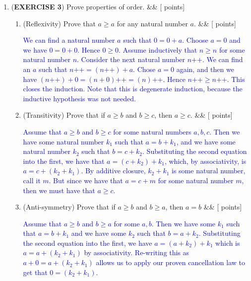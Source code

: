 \documentclass[12pt]{article}
\newcommand{\points}[1]{\hfill {[#1 points]}}
\newcommand{\problem}[2][]{%
  \item {#2}%
  \ifx&#1&%
  \else%
    \points{#1}%
  \fi
  \par\vspace{0.5em}
}
\begin{document}
\begin{enumerate}[leftmargin=*, label=\textbf{\arabic*.}]
	\problem{(\textbf{EXERCISE 3}) Prove properties of order.}
	\begin{enumerate}
	   \problem{(Reflexivity) Prove that $a \geq a$ for any natural number $a$.}
    	\textcolor{blue}{We can find a natural number $a$ such that $0 = 0 + a$. Choose $a=0$ and we have $0 = 0+0$. Hence $0 \geq 0$. Assume inductively that $n \geq n$ for some natural number $n$. Consider the next natural number $n\text{++}$. We can find an $a$ such that $n\text{++} = (n\text{++}) + a$. Chose $a=0$ again, and then we have $(n\text{++}) + 0 = (n+0)\text{++} = (n)\text{++}$. Hence $n\text{++} \geq n\text{++}$. This closes the induction. Note that this is degenerate induction, because the inductive hypothesis was not needed.}
	   \problem{(Transitivity) Prove that if $a \geq b$ and $b \geq c$, then $a \geq c$.}
    	\textcolor{blue}{Assume that $a \geq b$ and $b \geq c$ for some natural numbers $a,b,c$. Then we have some natural number $k_1$ such that $a = b + k_1$, and we have some natural number $k_2$ such that $b = c + k_2$. Substituting the second equation into the first, we have that $a = (c + k_2) + k_1$, which, by associativity, is $a = c + (k_2 + k_1)$. By additive closure, $k_2 + k_1$ is some natural number, call it $m$. But since we have that $a = c + m$ for some natural number $m$, then we must have that $a \geq c$.}
	
	\problem{(Anti-symmetry) Prove that if $a \geq b$ and $b \geq a$, then $a = b$}
	\textcolor{blue}{Assume that $a \geq b$ and $b \geq a$ for some $a,b$. Then we have some $k_1$ such that $a = b + k_1$ and we have some $k_2$ such that $b = a + k_2$. Substituting the second equation into the first, we have $a = (a + k_2) + k_1$ which is $a = a + (k_2 + k_1)$ by associativity. Re-writing this as $a + 0 = a + (k_2 + k_1)$ allows us to apply our proven cancellation law to get that $0 = (k_2 + k_1)$.}
	\end{enumerate}

\end{enumerate}
\end{document}
